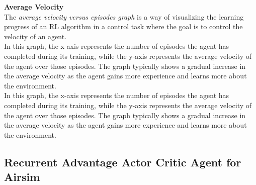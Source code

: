 \documentclass[conference]{IEEEtran}
\begin{document}
\textbf{Average Velocity}\\

The \textit{average velocity versus episodes graph} is a way of visualizing the learning progress of an RL algorithm in a control task where the goal is to control the velocity of an agent. \\

In this graph, the x-axis represents the number of episodes the agent has completed during its training, while the y-axis represents the average velocity of the agent over those episodes. The graph typically shows a gradual increase in the average velocity as the agent gains more experience and learns more about the environment.\\

In this graph, the x-axis represents the number of episodes the agent has completed during its training, while the y-axis represents the average velocity of the agent over those episodes. The graph typically shows a gradual increase in the average velocity as the agent gains more experience and learns more about the environment.\\


\subsection{Recurrent Advantage Actor Critic Agent for Airsim }\\
\end{document}
